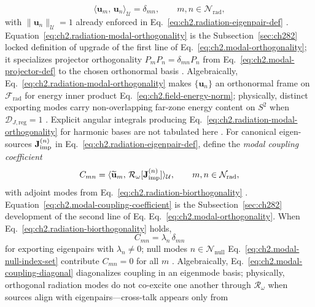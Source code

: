 \begin{equation}
\label{eq:ch2.radiation-modal-orthogonality}
\langle \mathbf{u}_m,\,\mathbf{u}_n\rangle_{\mathcal{U}}
=
\delta_{mn},
\qquad
m,n\in\mathcal{N}_{\mathrm{rad}},
\end{equation}
with \(\|\mathbf{u}_n\|_{\mathcal{U}}=1\) already enforced in
Eq.~\eqref{eq:ch2.radiation-eigenpair-def} \cite{stratton1941}.
Equation~\eqref{eq:ch2.radiation-modal-orthogonality} is the Subsection~\ref{sec:ch282} locked definition of
upgrade of the first line of Eq.~\eqref{eq:ch2.modal-orthogonality}; it
specializes projector orthogonality \(P_m P_n=\delta_{mn}P_n\) from
Eq.~\eqref{eq:ch2.modal-projector-def} to the chosen orthonormal basis
\cite{stratton1941}. Algebraically, Eq.~\eqref{eq:ch2.radiation-modal-orthogonality} makes
\(\{\mathbf{u}_n\}\) an orthonormal frame on \(\mathcal{F}_{\mathrm{rad}}\) for energy inner
product Eq.~\eqref{eq:ch2.field-energy-norm}; physically, distinct exporting modes carry
non-overlapping far-zone energy content on \(S^{2}\) when
\(\mathcal{D}_{J,\mathrm{reg}}=1\) \cite{jackson1999}. Explicit angular
integrals producing Eq.~\eqref{eq:ch2.radiation-modal-orthogonality} for harmonic bases are
not tabulated here \cite{stratton1941}.
For canonical eigen-sources \(\mathbf{J}_{\mathrm{imp}}^{(n)}\) in Eq.~\eqref{eq:ch2.radiation-eigenpair-def},
define the \emph{modal coupling coefficient}
\begin{equation}
\label{eq:ch2.modal-coupling-coefficient}
C_{mn}
=
\langle \widetilde{\mathbf{u}}_m,\,\mathcal{R}_\omega[\mathbf{J}_{\mathrm{imp}}^{(n)}]\rangle_{\mathcal{U}},
\qquad
m,n\in\mathcal{N}_{\mathrm{rad}},
\end{equation}
with adjoint modes from Eq.~\eqref{eq:ch2.radiation-biorthogonality}
\cite{stratton1941}. Equation~\eqref{eq:ch2.modal-coupling-coefficient} is the
Subsection~\ref{sec:ch282} development of the second line of Eq.
Eq.~\eqref{eq:ch2.modal-orthogonality}. When
Eq.~\eqref{eq:ch2.radiation-biorthogonality} holds,
\begin{equation}
\label{eq:ch2.modal-coupling-diagonal}
C_{mn}=\lambda_n\,\delta_{mn}
\end{equation}
for exporting eigenpairs with \(\lambda_n\neq 0\); null modes
\(n\in\mathcal{N}_{\mathrm{null}}\) Eq.~\eqref{eq:ch2.modal-null-index-set} contribute
\(C_{mn}=0\) for all \(m\) \cite{stratton1941}. Algebraically,
Eq.~\eqref{eq:ch2.modal-coupling-diagonal} diagonalizes coupling in an eigenmode basis;
physically, orthogonal radiation modes do not co-excite one another through
\(\mathcal{R}_\omega\) when sources align with eigenpairs---cross-talk appears only from
